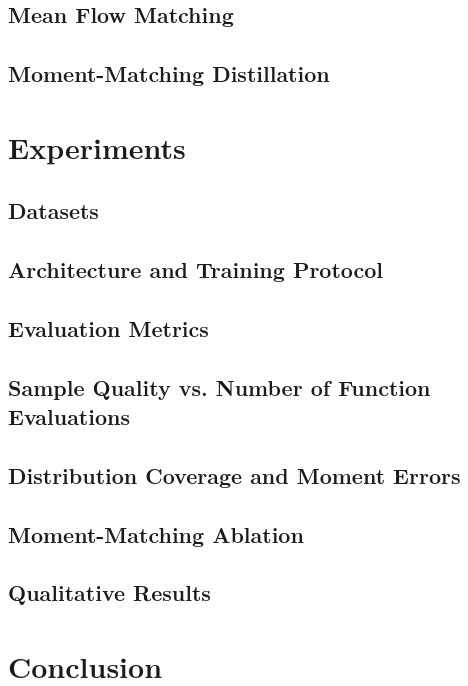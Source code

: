 \documentclass{article}
\begin{document}
\subsection{Mean Flow Matching}
\lipsum[20-21]

\subsection{Moment-Matching Distillation}
\lipsum[22-24]

\section{Experiments}
\label{sec:experiments}

\subsection{Datasets}
\lipsum[25-26]

\subsection{Architecture and Training Protocol}
\lipsum[27-28]

\subsection{Evaluation Metrics}
\lipsum[29-30]

\subsection{Sample Quality vs. Number of Function Evaluations}
\lipsum[31-32]

\subsection{Distribution Coverage and Moment Errors}
\lipsum[33-34]

\subsection{Moment-Matching Ablation}
\lipsum[35-36]

\subsection{Qualitative Results}
\lipsum[37-38]

\section{Conclusion}
\label{sec:conclusion}

\lipsum[39-41]



\end{document}
